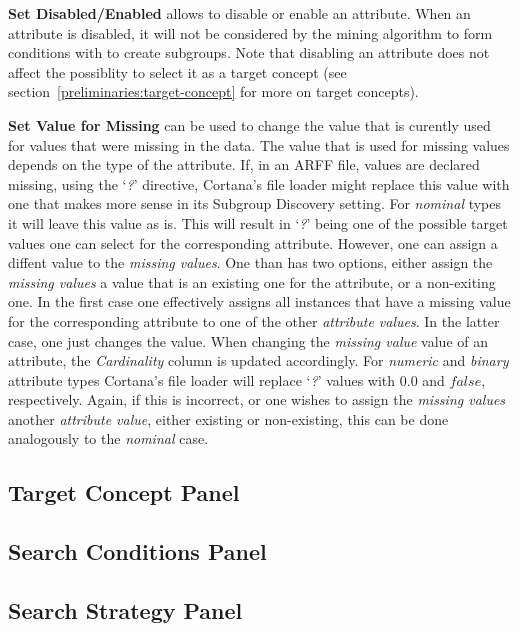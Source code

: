 \documentclass{article}
\begin{document}
\textbf{Set Disabled/Enabled} allows to disable or enable an attribute.
When an attribute is disabled, it will not be considered by the mining algorithm to form conditions with to create subgroups.
Note that disabling an attribute does not affect the possiblity to select it as a target concept (see section~\ref{preliminaries:target-concept} for more on target concepts).

\textbf{Set Value for Missing} can be used to change the value that is curently used for values that were missing in the data.
The value that is used for missing values depends on the type of the attribute.
If, in an ARFF file, values are declared missing, using the `\emph{?}' directive, Cortana's file loader might replace this value with one that makes more sense in its Subgroup Discovery setting.
For \emph{nominal} types it will leave this value as is.
This will result in `\emph{?}' being one of the possible target values one can select for the corresponding attribute.
However, one can assign a diffent value to the \emph{missing values}.
One than has two options, either assign the \emph{missing values} a value that is an existing one for the attribute, or a non-exiting one.
In the first case one effectively assigns all instances that have a missing value for the corresponding attribute to one of the other \emph{attribute values}.
In the latter case, one just changes the value.
When changing the \emph{missing value} value of an attribute, the \emph{Cardinality} column is updated accordingly.
For \emph{numeric} and \emph{binary} attribute types Cortana's file loader will replace `\emph{?}' values with $0.0$ and $false$, respectively.
Again, if this is incorrect, or one wishes to assign the \emph{missing values} another \emph{attribute value}, either existing or non-existing, this can be done analogously to the \emph{nominal} case.

\subsection{Target Concept Panel}

\subsection{Search Conditions Panel}

\subsection{Search Strategy Panel}
\end{document}
